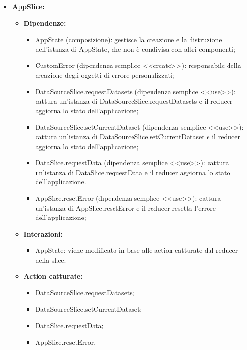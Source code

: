 \begin{itemize}
      \item \textbf{AppSlice:}
            \begin{itemize}
                  \item \textbf{Dipendenze:}
                        \begin{itemize}
                              \item AppState (composizione): gestisce la creazione e la distruzione dell'istanza di
                                    AppState, che non è condivisa con altri componenti;
                              \item CustomError (dipendenza semplice <<create>>): responsabile della creazione
                                    degli oggetti di errore personalizzati;
                              \item DataSourceSlice.requestDatasets (dipendenza semplice <<use>>): cattura
                                    un'istanza di DataSourceSlice.requestDatasets e il reducer aggiorna lo stato
                                    dell'applicazione;
                              \item DataSourceSlice.setCurrentDataset (dipendenza semplice <<use>>): cattura
                                    un'istanza di DataSourceSlice.setCurrentDataset e il reducer aggiorna lo stato
                                    dell'applicazione;
                              \item DataSlice.requestData (dipendenza semplice <<use>>): cattura un'istanza di
                                    DataSlice.requestData e il reducer aggiorna lo stato dell'applicazione.
                              \item AppSlice.resetError (dipendenza semplice <<use>>): cattura un'istanza di AppSlice.resetError
                                    e il reducer resetta l'errore dell'applicazione;
                        \end{itemize}
                  \item \textbf{Interazioni:}
                        \begin{itemize}
                              \item AppState: viene modificato in base alle action catturate dal reducer della
                                    slice.
                        \end{itemize}
                  \item \textbf{Action catturate:}
                        \begin{itemize}
                              \item DataSourceSlice.requestDatasets;
                              \item DataSourceSlice.setCurrentDataset;
                              \item DataSlice.requestData;
                              \item AppSlice.resetError.
                        \end{itemize}
            \end{itemize}


\end{itemize}
